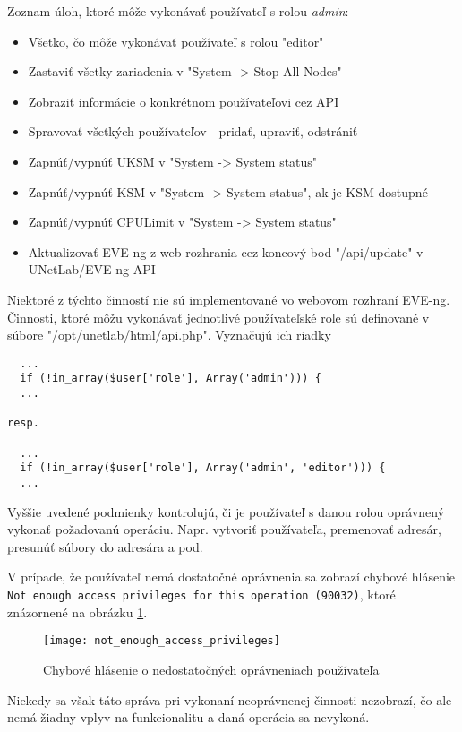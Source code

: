 \noindent
Zoznam úloh, ktoré môže vykonávať používateľ s rolou \emph{admin}:

\begin{itemize}[noitemsep]
    \item Všetko, čo môže vykonávať používateľ s rolou "editor"
    \item Zastaviť všetky zariadenia v "System -> Stop All Nodes"
    \item Zobraziť informácie o konkrétnom používateľovi cez API
    \item Spravovať všetkých používateľov - pridať, upraviť, odstrániť
    \item Zapnúť/vypnúť UKSM v "System -> System status"
    \item Zapnúť/vypnúť KSM v "System -> System status", ak je KSM dostupné
    \item Zapnúť/vypnúť CPULimit v "System -> System status"
    \item Aktualizovať EVE-ng z web rozhrania cez koncový bod "/api/update" v UNetLab/EVE-ng API
\end{itemize}

Niektoré z týchto činností nie sú implementované vo webovom rozhraní EVE-ng. Činnosti, ktoré môžu vykonávať jednotlivé používateľské role sú definované v súbore "/opt/unetlab/html/api.php". Vyznačujú ich riadky

\begin{verbatim}
  ...
  if (!in_array($user['role'], Array('admin'))) {
  ...

resp.

  ...
  if (!in_array($user['role'], Array('admin', 'editor'))) {
  ...
\end{verbatim}

Vyššie uvedené podmienky kontrolujú, či je používateľ s danou rolou oprávnený vykonať požadovanú operáciu. Napr. vytvoriť používateľa, premenovať adresár, presunúť súbory do adresára a pod.

V prípade, že používateľ nemá dostatočné oprávnenia sa zobrazí chybové hlásenie \texttt{Not enough access privileges for this operation (90032)}, ktoré znázornené na obrázku \ref{obr:not_enough_access_privileges}.

\begin{figure}
    \centering
    \texttt{[image: not\_enough\_access\_privileges]}
    \caption{Chybové hlásenie o nedostatočných oprávneniach používateľa}
    \label{obr:not_enough_access_privileges}
\end{figure}

Niekedy sa však táto správa pri vykonaní neoprávnenej činnosti nezobrazí, čo ale nemá žiadny vplyv na funkcionalitu a daná operácia sa nevykoná.